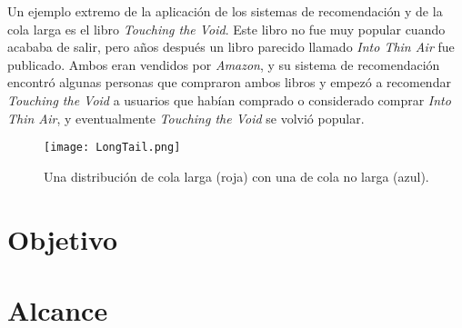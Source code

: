 Un ejemplo extremo de la aplicación de los sistemas de recomendación y de la cola larga es el libro \textit{Touching the Void}. Este libro no fue muy popular cuando acababa de salir, pero años después un libro parecido llamado \textit{Into Thin Air} fue publicado. Ambos eran vendidos por \textit{Amazon}, y su sistema de recomendación encontró algunas personas que compraron ambos libros y empezó a recomendar \textit{Touching the Void} a usuarios que habían comprado o considerado comprar \textit{Into Thin Air}, y eventualmente \textit{Touching the Void} se volvió popular.

\begin{figure}
  \centering
    \texttt{[image: LongTail.png]}
  \caption{Una distribución de cola larga (roja) con una de cola no larga (azul).}
  \label{fig:longtailimg}
\end{figure}

\section{Objetivo}

\section{Alcance}